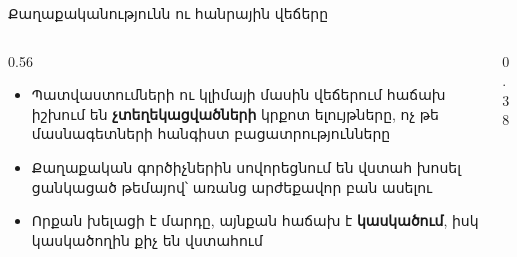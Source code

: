 \begin{frame}{Քաղաքականությունն ու հանրային վեճերը}
  \begin{columns}[c]
    \begin{column}{0.56\textwidth}
      \begin{itemize}
        \item Պատվաստումների ու կլիմայի մասին վեճերում հաճախ իշխում են \textbf{չտեղեկացվածների} կրքոտ ելույթները, ոչ թե մասնագետների հանգիստ բացատրությունները
        \item<2-> Քաղաքական գործիչներին սովորեցնում են վստահ խոսել ցանկացած թեմայով՝ առանց արժեքավոր բան ասելու
        \item<3-> Որքան խելացի է մարդը, այնքան հաճախ է \textbf{կասկածում}, իսկ կասկածողին քիչ են վստահում
      \end{itemize}
    \end{column}
    \begin{column}{0.38\textwidth}
      \centering
    \end{column}
  \end{columns}
\end{frame}

